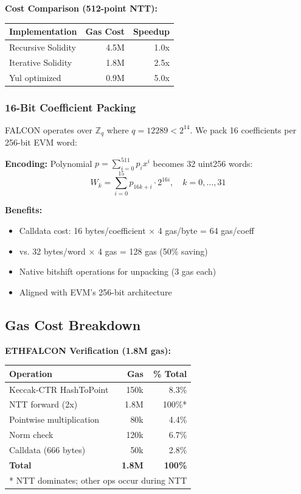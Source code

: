 \textbf{Cost Comparison (512-point NTT):}
\begin{center}
\begin{tabular}{lrr}
\hline
\textbf{Implementation} & \textbf{Gas Cost} & \textbf{Speedup} \\
\hline
Recursive Solidity & 4.5M & 1.0x \\
Iterative Solidity & 1.8M & 2.5x \\
Yul optimized & 0.9M & 5.0x \\
\hline
\end{tabular}
\end{center}

\subsubsection{16-Bit Coefficient Packing}

FALCON operates over $\mathbb{Z}_q$ where $q = 12289 < 2^{14}$. We pack 16 coefficients per 256-bit EVM word:

\textbf{Encoding:} Polynomial $p = \sum_{i=0}^{511} p_i x^i$ becomes 32 uint256 words:
\begin{equation}
W_k = \sum_{i=0}^{15} p_{16k+i} \cdot 2^{16i}, \quad k = 0, \ldots, 31
\end{equation}

\textbf{Benefits:}
\begin{itemize}
    \item Calldata cost: 16 bytes/coefficient $\times$ 4 gas/byte = 64 gas/coeff
    \item vs. 32 bytes/word $\times$ 4 gas = 128 gas (50\% saving)
    \item Native bitshift operations for unpacking (3 gas each)
    \item Aligned with EVM's 256-bit architecture
\end{itemize}

\subsection{Gas Cost Breakdown}

\textbf{ETHFALCON Verification (1.8M gas):}
\begin{center}
\begin{tabular}{lrr}
\hline
\textbf{Operation} & \textbf{Gas} & \textbf{\% Total} \\
\hline
Keccak-CTR HashToPoint & 150k & 8.3\% \\
NTT forward (2x) & 1.8M & 100\%* \\
Pointwise multiplication & 80k & 4.4\% \\
Norm check & 120k & 6.7\% \\
Calldata (666 bytes) & 50k & 2.8\% \\
\hline
\textbf{Total} & \textbf{1.8M} & \textbf{100\%} \\
\hline
\multicolumn{3}{l}{* NTT dominates; other ops occur during NTT}
\end{tabular}
\end{center}

